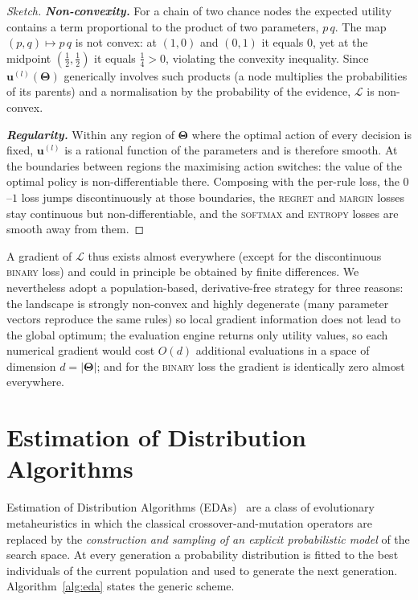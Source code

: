 \begin{proof}[Sketch]
\textbf{\emph{Non-convexity.}} For a chain of two chance nodes the expected
utility contains a term proportional to the product of two parameters,
$p\,q$. The map $(p,q)\mapsto p\,q$ is not convex: at $(1,0)$ and
$(0,1)$ it equals $0$, yet at the midpoint $(\tfrac12,\tfrac12)$ it
equals $\tfrac14>0$, violating the convexity inequality. Since
$\mathbf{u}^{(l)}(\boldsymbol{\Theta})$ generically involves such
products (a node multiplies the probabilities of its parents) and a
normalisation by the probability of the evidence, $\mathcal{L}$ is
non-convex.

\textbf{\emph{Regularity.}} Within any region of $\boldsymbol{\Theta}$ where the
optimal action of every decision is fixed, $\mathbf{u}^{(l)}$ is a
rational function of the parameters and is therefore smooth. At the
boundaries between regions the maximising action switches: the value of the optimal policy is non-differentiable there. Composing with the per-rule loss,
the $0$--$1$ loss jumps discontinuously at those boundaries, the
\textsc{regret} and \textsc{margin} losses stay continuous but
non-differentiable, and the \textsc{softmax} and \textsc{entropy} losses
are smooth away from them.
\end{proof}

\noindent A gradient of $\mathcal{L}$ thus exists almost everywhere
(except for the discontinuous \textsc{binary} loss) and could in
principle be obtained by finite differences. We nevertheless adopt a
population-based, derivative-free strategy for three reasons: the
landscape is strongly non-convex and highly degenerate (many parameter vectors reproduce the same rules) so local gradient information does not
lead to the global optimum; the evaluation engine returns only utility
values, so each numerical gradient would cost $O(d)$ additional
evaluations in a space of dimension $d=|\boldsymbol{\Theta}|$; and for the
\textsc{binary} loss the gradient is identically zero almost everywhere.


\section{Estimation of Distribution Algorithms}

Estimation of Distribution Algorithms
(EDAs)~\cite{larranaga2002eda,larranaga2024edas} are a class of
evolutionary metaheuristics in which the classical
crossover-and-mutation operators are replaced by the
\emph{construction and sampling of an explicit probabilistic model}
of the search space. At every generation a probability distribution
is fitted to the best individuals of the current population and used
to generate the next generation. Algorithm~\ref{alg:eda} states the
generic scheme.
\newpage

